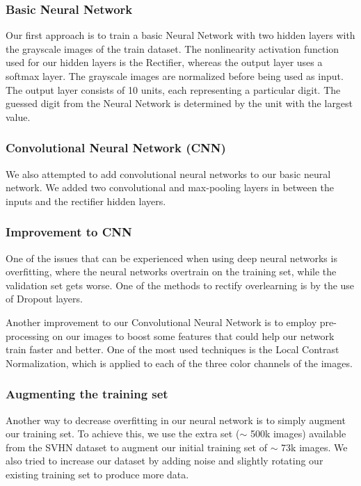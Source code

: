 \documentclass{article} %
\begin{document}
\subsubsection{Basic Neural Network}
Our first approach is to train a basic Neural Network with two hidden layers with the grayscale images of the train dataset. The nonlinearity activation function used for our hidden layers is the Rectifier\cite{relu}, whereas the output layer uses a softmax layer. The grayscale images are normalized before being used as input. The output layer consists of 10 units, each representing a particular digit. The guessed digit from the Neural Network is determined by the unit with the largest value.

\subsubsection{Convolutional Neural Network (CNN)}
We also attempted to add convolutional neural networks to our basic neural network. We added two convolutional and max-pooling layers in between the inputs and the rectifier hidden layers.


\subsubsection{Improvement to CNN}
One of the issues that can be experienced when using deep neural networks is overfitting, where the neural networks overtrain on the training set, while the validation set gets worse. One of the methods to rectify overlearning is by the use of Dropout layers.

Another improvement to our Convolutional Neural Network is to employ pre-processing on our images to boost some features that could help our network train faster and better. One of the most used techniques is the Local Contrast Normalization, which is applied to each of the three color channels of the images.

\subsubsection{Augmenting the training set}
Another way to decrease overfitting in our neural network is to simply augment our training set. To achieve this, we use the extra set ($\sim$ 500k images) available from the SVHN dataset to augment our initial training set of $\sim$ 73k images. We also tried to increase our dataset by adding noise and slightly rotating our existing training set to produce more data.
\end{document}
